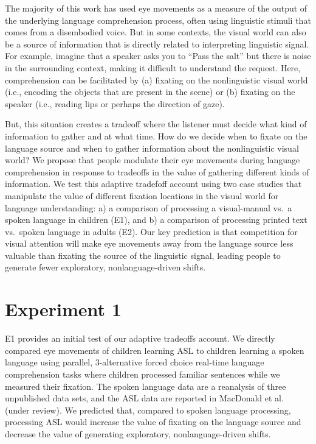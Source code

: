 \documentclass[10pt, letterpaper]{article}
\begin{document}
The majority of this work has used eye movements as a measure of the
output of the underlying language comprehension process, often using
linguistic stimuli that comes from a disembodied voice. But in some
contexts, the visual world can also be a source of information that is
directly related to interpreting linguistic signal. For example, imagine
that a speaker asks you to ``Pass the salt'' but there is noise in the
surrounding context, making it difficult to understand the request.
Here, comprehension can be facilitated by (a) fixating on the
nonlinguistic visual world (i.e., encoding the objects that are present
in the scene) or (b) fixating on the speaker (i.e., reading lips or
perhaps the direction of gaze).

But, this situation creates a tradeoff where the listener must decide
what kind of information to gather and at what time. How do we decide
when to fixate on the language source and when to gather information
about the nonlinguistic visual world? We propose that people modulate
their eye movements during language comprehension in response to
tradeoffs in the value of gathering different kinds of information. We
test this adaptive tradefoff account using two case studies that
manipulate the value of different fixation locations in the visual world
for language understanding: a) a comparison of processing a
visual-manual vs.~a spoken language in children (E1), and b) a
comparison of processing printed text vs.~spoken language in adults
(E2). Our key prediction is that competition for visual attention will
make eye movements away from the language source less valuable than
fixating the source of the linguistic signal, leading people to generate
fewer exploratory, nonlanguage-driven shifts.

\section{Experiment 1}\label{experiment-1}

E1 provides an initial test of our adaptive tradeoffs account. We
directly compared eye movements of children learning ASL to children
learning a spoken language using parallel, 3-alternative forced choice
real-time language comprehension tasks where children processed familiar
sentences while we measured their fixation. The spoken language data are
a reanalysis of three unpublished data sets, and the ASL data are
reported in MacDonald et al. (under review). We predicted that, compared
to spoken language processing, processing ASL would increase the value
of fixating on the language source and decrease the value of generating
exploratory, nonlanguage-driven shifts.
\end{document}
